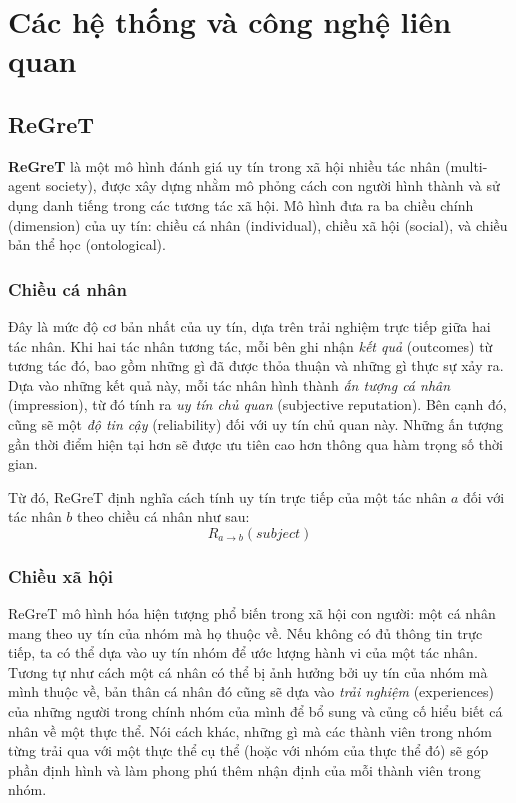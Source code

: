 \chapter{Các hệ thống và công nghệ liên quan}

\section{ReGreT}

\textbf{ReGreT} \cite{regret-reputation-system} là một mô hình đánh giá uy tín trong xã hội nhiều tác nhân (multi-agent society), được xây dựng nhằm mô phỏng cách con người hình thành và sử dụng danh tiếng trong các tương tác xã hội.
Mô hình đưa ra ba chiều chính (dimension) của uy tín: chiều cá nhân (individual), chiều xã hội (social), và chiều bản thể học (ontological).

\subsection{Chiều cá nhân}

Đây là mức độ cơ bản nhất của uy tín, dựa trên trải nghiệm trực tiếp giữa hai tác nhân. Khi hai tác nhân tương tác, mỗi bên ghi nhận \textit{kết quả} (outcomes) từ tương tác đó, bao gồm những gì đã được thỏa thuận và những gì thực sự xảy ra.
Dựa vào những kết quả này, mỗi tác nhân hình thành \textit{ấn tượng cá nhân} (impression), từ đó tính ra \textit{uy tín chủ quan} (subjective reputation). Bên cạnh đó, cũng sẽ một
\textit{độ tin cậy} (reliability) đối với uy tín chủ quan này. Những ấn tượng gần thời điểm hiện tại hơn sẽ được ưu tiên cao hơn thông qua hàm trọng số thời gian.

Từ đó, ReGreT định nghĩa cách tính uy tín trực tiếp của một tác nhân $a$ đối với tác nhân $b$ theo chiều cá nhân như sau:
\[R_{a \rightarrow b}(subject)\]

\subsection{Chiều xã hội}

ReGreT mô hình hóa hiện tượng phổ biến trong xã hội con người: một cá nhân mang theo uy tín của nhóm mà họ thuộc về. Nếu không có đủ thông tin trực tiếp, ta có thể dựa vào uy tín nhóm để ước lượng hành vi của một tác nhân.
Tương tự như cách một cá nhân có thể bị ảnh hưởng bởi uy tín của nhóm mà mình thuộc về, bản thân cá nhân đó cũng sẽ dựa vào \textit{trải nghiệm} (experiences) của những người trong chính nhóm của mình để bổ sung và củng cố hiểu biết cá nhân về một thực thể.
Nói cách khác, những gì mà các thành viên trong nhóm từng trải qua với một thực thể cụ thể (hoặc với nhóm của thực thể đó) sẽ góp phần định hình và làm phong phú thêm nhận định của mỗi thành viên trong nhóm.

